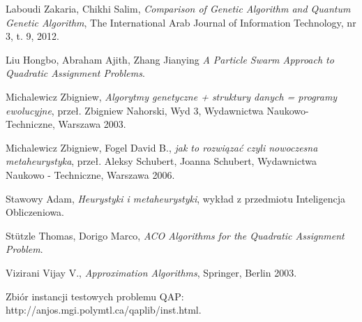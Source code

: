 \begin{thebibliography}{99}
 Laboudi Zakaria, Chikhi Salim,  \textit{Comparison of Genetic Algorithm and Quantum
Genetic Algorithm}, The International Arab Journal of Information Technology, nr 3, t. 9, 2012.

 Liu Hongbo, Abraham Ajith, Zhang Jianying \textit{A Particle Swarm Approach to Quadratic Assignment Problems}.

 Michalewicz Zbigniew, \textit{Algorytmy genetyczne + struktury danych = programy ewolucyjne}, przeł. Zbigniew Nahorski, Wyd 3, Wydawnictwa Naukowo-  Techniczne, Warszawa 2003.

 Michalewicz Zbigniew, Fogel David B., \textit{jak to rozwiązać czyli nowoczesna metaheurystyka}, przeł. Aleksy Schubert, Joanna Schubert, Wydawnictwa Naukowo - Techniczne, Warszawa 2006.

 Stawowy Adam, \textit{Heurystyki i metaheurystyki}, wykład z przedmiotu Inteligencja Obliczeniowa.

 St\"utzle Thomas, Dorigo Marco, \textit{ACO Algorithms for the Quadratic Assignment Problem}.

 Vizirani Vijay V., \textit{Approximation Algorithms}, Springer, Berlin 2003.

 Zbiór instancji testowych problemu QAP: http://anjos.mgi.polymtl.ca/qaplib/inst.html.

\end{thebibliography}